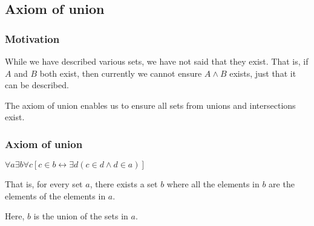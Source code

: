 
\subsection{Axiom of union}


\subsubsection{Motivation}

While we have described various sets, we have not said that they exist. That is, if \(A\) and \(B\) both exist, then currently we cannot ensure \(A\land B\) exists, just that it can be described.

The axiom of union enables us to ensure all sets from unions and intersections exist.

\subsubsection{Axiom of union}

\(\forall a\exists b \forall c [c\in b\leftrightarrow \exists d(c\in d\land d\in a)]\)

That is, for every set \(a\), there exists a set \(b\) where all the elements in \(b\) are the elements of the elements in \(a\).

Here, \(b\) is the union of the sets in \(a\).

